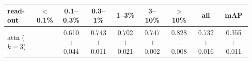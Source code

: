 \begin{tabular}{lcccccccc}
\toprule
read-out & $<$0.1\% & 0.1--0.3\% & 0.3--1\% & 1--3\% & 3--10\% & $>$10\% & all & mAP \\
\midrule
attn ($k=3$) & -- & 0.610 $\pm$ 0.044 & 0.743 $\pm$ 0.011 & 0.702 $\pm$ 0.021 & 0.747 $\pm$ 0.002 & 0.828 $\pm$ 0.008 & 0.732 $\pm$ 0.016 & 0.355 $\pm$ 0.011 \\
\bottomrule
\end{tabular}
